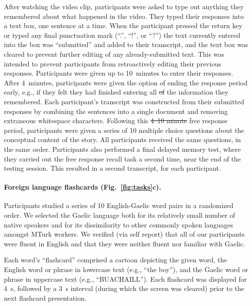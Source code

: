 \documentclass[10pt]{article}
\providecommand{\DIFaddtex}[1]{{\protect\color{blue}\uwave{#1}}} %
\providecommand{\DIFdeltex}[1]{{\protect\color{red}\sout{#1}}}                      %
\providecommand{\DIFaddbegin}{} %
\providecommand{\DIFaddend}{} %
\providecommand{\DIFdelbegin}{} %
\providecommand{\DIFdelend}{} %
\providecommand{\DIFadd}[1]{\texorpdfstring{\DIFaddtex{#1}}{#1}} %
\providecommand{\DIFdel}[1]{\texorpdfstring{\DIFdeltex{#1}}{}} %
\newcommand{\DIFscaledelfig}{0.5}
\newlength{\DIFdelgraphicswidth} %
\newlength{\DIFdelgraphicsheight} %
\newcommand{\DIFaddincludegraphics}[2][]{{\color{blue}\fbox{\DIFOincludegraphics[#1]{#2}}}} %
\newcommand{\DIFdelincludegraphics}[2][]{%
\sbox{\DIFdelgraphicsbox}{\DIFOincludegraphics[#1]{#2}}%
\settoboxwidth{\DIFdelgraphicswidth}{\DIFdelgraphicsbox} %
\settoboxtotalheight{\DIFdelgraphicsheight}{\DIFdelgraphicsbox} %
\scalebox{\DIFscaledelfig}{%
\parbox[b]{\DIFdelgraphicswidth}{\usebox{\DIFdelgraphicsbox}\\[-\baselineskip] \rule{\DIFdelgraphicswidth}{0em}}\llap{\resizebox{\DIFdelgraphicswidth}{\DIFdelgraphicsheight}{%
\setlength{\unitlength}{\DIFdelgraphicswidth}%
\begin{picture}(1,1)%
\thicklines\linethickness{2pt} %
{\color[rgb]{1,0,0}\put(0,0){\framebox(1,1){}}}%
{\color[rgb]{1,0,0}\put(0,0){\line( 1,1){1}}}%
{\color[rgb]{1,0,0}\put(0,1){\line(1,-1){1}}}%
\end{picture}%
}\hspace*{3pt}}} %
} %
\DeclareRobustCommand{\DIFaddbegin}{\DIFOaddbegin \let\includegraphics\DIFaddincludegraphics} %
\DeclareRobustCommand{\DIFaddend}{\DIFOaddend \let\includegraphics\DIFOincludegraphics} %
\DeclareRobustCommand{\DIFdelbegin}{\DIFOdelbegin \let\includegraphics\DIFdelincludegraphics} %
\DeclareRobustCommand{\DIFdelend}{\DIFOaddend \let\includegraphics\DIFOincludegraphics} %
\begin{document}
After watching the video clip, participants were asked to type out
anything they remembered about what happened in the video.  They typed
their responses into a text box, one sentence at a time.  When the
participant pressed the return key or typed any final punctuation mark
(``.'', ``!'', or ``?'') the text currently entered into the box was
``submitted'' and added to their transcript, and the text box was
cleared to prevent further editing of any already-submitted text.
This was intended to prevent participants from retroactively editing
their previous responses.  Participants were given up to 10~minutes to
enter their responses.  After 4~minutes, participants were given the
option of ending the response period early, e.g., if they felt they
had finished entering all \DIFdelbegin \DIFdel{of }\DIFdelend the information they remembered.  Each
participant's transcript was constructed from their submitted
responses by combining the sentences into a single document and
removing extraneous whitespace characters.  Following this \DIFdelbegin \DIFdel{4--10
minute }\DIFdelend \DIFaddbegin \DIFadd{4--10-minute }\DIFaddend free response period, participants were given a series of 10
multiple choice questions about the conceptual content of the story.
All participants received the same questions, in the same order.
Participants also performed a final delayed memory test, where they
carried out the free response recall task a second time, near the end
of the testing session.  This resulted in a second transcript, for
each participant.

\paragraph*{Foreign language flashcards (Fig.~\ref{fig:tasks}c).}
Participants studied a series of 10 English-Gaelic word pairs in a
randomized order.  We selected the Gaelic language both for its
relatively small number of native speakers and for its dissimilarity
to other commonly spoken languages amongst MTurk workers.
We verified (via self report) that all of our participants were fluent
in English and that they were neither fluent nor familiar with Gaelic.

Each word's ``flashcard'' comprised a cartoon depicting the given
word, the English word or phrase in lowercase text (e.g., ``the
boy''), and the Gaelic word or phrase in uppercase text (e.g.,
``BUACHAILL'').  Each flashcard was displayed for 4~s, followed by a
3~s interval (during which the screen was cleared) prior to the next
flashcard presentation.
\end{document}
